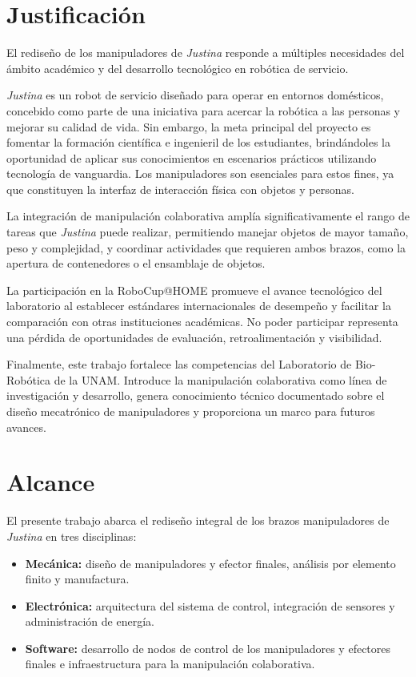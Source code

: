 \section{Justificaci\'on}

El rediseño de los manipuladores de \emph{Justina} responde a múltiples necesidades del ámbito académico y del desarrollo tecnológico en robótica de servicio.

\emph{Justina} es un robot de servicio diseñado para operar en entornos domésticos, concebido como parte de una iniciativa para acercar la robótica a las personas y mejorar su calidad de vida. Sin embargo, la meta principal del proyecto es fomentar la formación científica e ingenieril de los estudiantes, brindándoles la oportunidad de aplicar sus conocimientos en escenarios prácticos utilizando tecnología de vanguardia\cite{BioRoboticsUNAM}. Los manipuladores son esenciales para estos fines, ya que constituyen la interfaz de interacción física con objetos y personas.  

La integración de manipulación colaborativa amplía significativamente el rango de tareas que \emph{Justina} puede realizar, permitiendo manejar objetos de mayor tamaño, peso y complejidad, y coordinar actividades que requieren ambos brazos, como la apertura de contenedores o el ensamblaje de objetos.

La participación en la RoboCup@HOME promueve el avance tecnológico del laboratorio al establecer estándares internacionales de desempeño y facilitar la comparación con otras instituciones académicas. No poder participar representa una pérdida de oportunidades de evaluación, retroalimentación y visibilidad.

Finalmente, este trabajo fortalece las competencias del Laboratorio de Bio-Robótica de la UNAM. Introduce la manipulación colaborativa como línea de investigación y desarrollo, genera conocimiento técnico documentado sobre el diseño mecatrónico de manipuladores y proporciona un marco para futuros avances.

\section{Alcance}

El presente trabajo abarca el rediseño integral de los brazos manipuladores de \emph{Justina} en tres disciplinas:

\begin{itemize}
    \item \textbf{Mecánica:} diseño de manipuladores y efector finales, análisis por elemento finito y manufactura.
    \item \textbf{Electrónica:} arquitectura del sistema de control, integración de sensores y administración de energía.
    \item \textbf{Software:} desarrollo de nodos de control de los manipuladores y efectores finales e infraestructura para la manipulación colaborativa.
\end{itemize}

